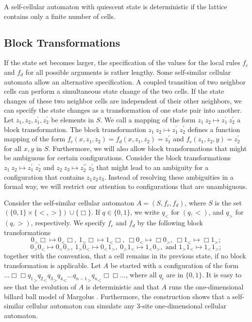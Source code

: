 \documentclass{article}
\theoremstyle{definition}
\begin{document}
A self-cellular automaton with quiescent state is deterministic if the lattice contains only a finite number of cells.

\subsection{Block Transformations}
\label{sec:block-trans}

If the state set becomes larger, the specification of the values for the local rules $f_c$ and $f_d$ for all possible arguments
is rather lengthy.
Some self-similar cellular automata allow an alternative specification.
A coupled transition of two neighbor cells can perform a simultaneous state change of the two cells.
If the state changes of these two neighbor cells are independent of their other neighbors,
we can specify the state changes as a transformation of one state pair into another.
Let $z_1, z_2, z_1^\prime, z_2^\prime$ be elements in $S$.
We call a mapping of the form $z_1 \: z_2 \mapsto z_1^\prime \: z_2^\prime$ a block transformation.
The block transformation $z_1 \: z_2 \mapsto z_1^\prime \: z_2^\prime$ defines
 a function mapping of the form
$
f_c(x, z_1, z_2) = f_d(x, z_1, z_2) = z_1^\prime
$
and
$
f_c(z_1, z_2,y) = z_2^\prime
$
for all $x, y$ in $S$.
Furthermore, we will also allow block transformations that might be ambiguous for certain configurations.
Consider the block transformations
$z_1 \: z_2 \mapsto z_1^\prime \: z_2^\prime$
and
$z_2 \: z_3 \mapsto z_2^{\prime\prime} \: z_3^\prime$
that might lead to an ambiguity for a configuration that contains $z_1z_2z_3$.
Instead of resolving these ambiguities in a formal way, we will restrict our attention to
configurations that are unambiguous.

Consider the self-similar cellular automaton $A = (S, f_c, f_d)$, where $S$ is the set
$ (\{0,1\} \times \{<,>\}) \cup \{\Box\}$.
If $q \in \{0,1\}$, we write $q_<$ for $(q,<)$, and $q_>$ for $(q,>)$, respectively.
We specify  $f_c$ and $f_d$ by the following block transformations
\begin{equation}
0_>\Box \mapsto 0_<\Box, \: 1_>\Box \mapsto 1_<\Box, \: \Box0_< \mapsto \Box0_>, \: \Box1_< \mapsto \Box1_>;
\end{equation}
\begin{equation}
0_> 0_< \mapsto 0_< 0_>, \:  1_> 0_< \mapsto 0_< 1_>, \: 0_> 1_< \mapsto 1_< 0_>, \mbox{ and } 1_> 1_< \mapsto 1_< 1_>;
\end{equation}
together with the convention, that a cell remains in its previous state, if no block transformation is applicable.
Let $A$ be started with a configuration of the form
$\ldots \Box \Box {q_1}_> {q_2}_< {q_3}_> {q_4}_< \ldots {q_{n-1}}_> {q_{n}}_<  \Box \Box \ldots$, where all $q_i$ are in  $\{0,1\}$.
It is easy to see that the evolution of $A$ is deterministic and that
$A$ runs the one-dimensional billard ball model of Margolus \cite{margolus-billard}.
Furthermore, the construction shows that a self-similar cellular automaton can simulate any 3-site
one-dimensional cellular automaton.
\end{document}
